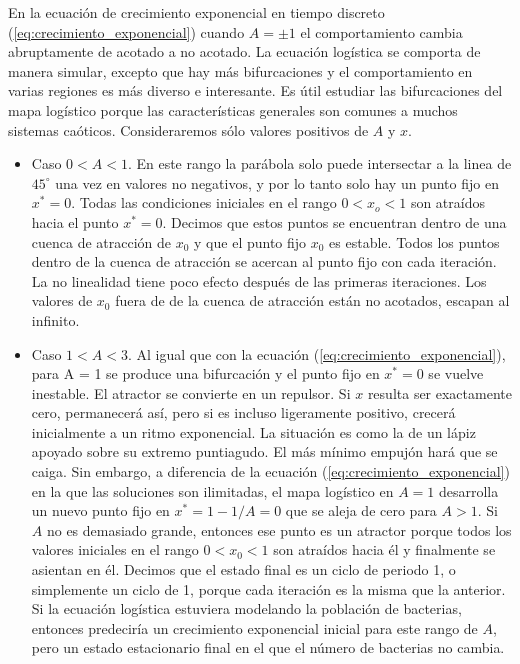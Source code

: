         En la ecuación de crecimiento exponencial en tiempo discreto (\ref{eq:crecimiento_exponencial}) cuando $A = \pm 1$ el comportamiento cambia abruptamente de acotado a no acotado. La ecuación logística se comporta de manera simular, excepto que hay más bifurcaciones y el comportamiento en varias regiones es más diverso e interesante. Es útil estudiar las bifurcaciones del mapa logístico porque las características generales son comunes a muchos sistemas caóticos. Consideraremos sólo valores positivos de $A$ y $x$.

        \begin{itemize}
            \item Caso $0 < A < 1$.
                En este rango la parábola solo puede intersectar a la linea de $45^{\circ}$ una vez en valores no negativos, y por lo tanto solo hay un punto fijo en $x^{*} = 0$. Todas las condiciones iniciales en el rango $0 < x_{o} < 1$ son atraídos hacia el punto $x^{*} = 0$. Decimos que estos puntos se encuentran dentro de una cuenca de atracción de $x_{0}$ y que el punto fijo $x_{0}$ es estable. Todos los puntos dentro de la cuenca de atracción se acercan al punto fijo con cada iteración. La no linealidad tiene poco efecto después de las primeras iteraciones. Los valores de $x_{0}$ fuera de de la cuenca de atracción están no acotados, escapan al infinito.
            \item Caso $1 < A < 3$.
                Al igual que con la ecuación (\ref{eq:crecimiento_exponencial}), para A = 1 se produce una bifurcación y el punto fijo en $x^{*} = 0$ se vuelve inestable. El atractor se convierte en un repulsor. Si $x$ resulta ser exactamente cero, permanecerá así, pero si es incluso ligeramente positivo, crecerá inicialmente a un ritmo exponencial. La situación es como la de un lápiz apoyado sobre su extremo puntiagudo. El más mínimo empujón hará que se caiga. Sin embargo, a diferencia de la ecuación (\ref{eq:crecimiento_exponencial}) en la que las soluciones son ilimitadas, el mapa logístico en $A = 1 $ desarrolla un nuevo punto fijo en $x^{*} = 1- 1/A = 0$ que se aleja de cero para $A > 1$. Si $A$ no es demasiado grande, entonces ese punto es un atractor porque todos los valores iniciales en el rango $0 < x_{0} < 1$ son atraídos hacia él y finalmente se asientan en él. Decimos que el estado final es un ciclo de periodo 1, o simplemente un ciclo de 1, porque cada iteración es la misma que la anterior. Si la ecuación logística estuviera modelando la población de bacterias, entonces predeciría un crecimiento exponencial inicial para este rango de $A$, pero un estado estacionario final en el que el número de bacterias no cambia.

\end{itemize}
